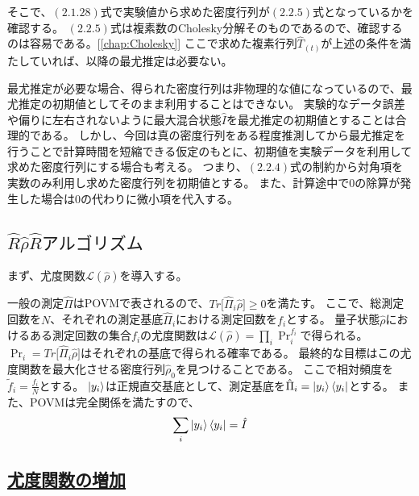 \documentclass[11pt,a4j,notitlepage]{jreport}
\begin{document}
	そこで、$(2.1.28)$式で実験値から求めた密度行列が$(2.2.5)$式となっているかを確認する。
	$(2.2.5)$式は複素数のCholesky分解そのものであるので、確認するのは容易である。[\autoref{chap:Cholesky}]
	ここで求めた複素行列$\hat{T}_{(t)}$が上述の条件を満たしていれば、以降の最尤推定は必要ない。

	最尤推定が必要な場合、得られた密度行列は非物理的な値になっているので、最尤推定の初期値としてそのまま利用することはできない。
	実験的なデータ誤差や偏りに左右されないように最大混合状態$\hat{I}$を最尤推定の初期値とすることは合理的である。
	しかし、今回は真の密度行列をある程度推測してから最尤推定を行うことで計算時間を短縮できる仮定のもとに、初期値を実験データを利用して求めた密度行列にする場合も考える。
	つまり、$(2.2.4)$式の制約から対角項を実数のみ利用し求めた密度行列を初期値とする。
	また、計算途中で0の除算が発生した場合は0の代わりに微小項を代入する。

	\subsection{$\hat{R}\hat{\rho}\hat{R}アルゴリズム$}

	まず、尤度関数$\mathcal{L} (\hat{\rho})$を導入する。

	一般の測定$\hat{\Pi}$はPOVMで表されるので、$Tr \big[ \hat{\Pi}_i \hat{\rho} \big] \geq 0$を満たす。
	ここで、総測定回数を$N$、それぞれの測定基底$\hat{\Pi}_i$における測定回数を$f_i$とする。
	量子状態$\hat{\rho}$におけるある測定回数の集合{$f_i$}の尤度関数は$\mathcal{L} (\hat{\rho}) = \prod_i \Pr_i^{f_i}$で得られる。
	$\Pr_i = Tr \big[ \hat{\Pi}_i \hat{\rho} \big]$はそれぞれの基底で得られる確率である。
	最終的な目標はこの尤度関数を最大化させる密度行列$\hat{\rho}_0$を見つけることである。
	ここで相対頻度を$\tilde{f}_i = \frac{f_i}{N}$とする。
	$\ket{y_i}$は正規直交基底として、測定基底を$\hat{\Pi}_i = \ket{y_i} \bra{y_i}$とする。
	また、POVMは完全関係を満たすので、
	\begin{equation}
		\sum_i \ket{y_i} \bra{y_i} = \hat{I}
	\end{equation}

	\subsection*{\underline{尤度関数の増加}}
\end{document}
